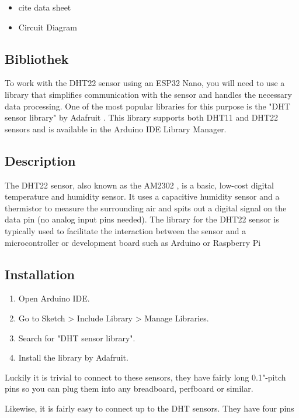 \begin{itemize}
  \item cite data sheet
  \item Circuit Diagram
\end{itemize}

\subsection{Bibliothek}

To work with the DHT22 sensor using an ESP32 Nano, you will need to use a library that simplifies communication with the sensor and handles the necessary data processing. One of the most popular libraries for this purpose is the "DHT sensor library" by Adafruit \cite{Widianto:2022}. This library supports both DHT11 and DHT22 sensors and is available in the Arduino IDE Library Manager.

\subsection{Description}
The DHT22 sensor, also known as the AM2302 \cite{Rupin:2023}, is a basic, low-cost digital temperature and humidity sensor. It uses a capacitive humidity sensor and a thermistor to measure the surrounding air and spits out a digital signal on the data pin (no analog input pins needed). The library for the DHT22 sensor is typically used to facilitate the interaction between the sensor and a microcontroller or development board such as Arduino or Raspberry Pi

\subsection{Installation}


	\begin{enumerate}
		\item Open Arduino IDE.
		\item Go to Sketch > Include Library > Manage Libraries.
		\item Search for "DHT sensor library".
		\item Install the library by Adafruit.
	\end{enumerate}


Luckily it is trivial to connect to these sensors, they have fairly long 0.1"-pitch pins so you can plug them into any breadboard, perfboard or similar.

Likewise, it is fairly easy to connect up to the DHT sensors. They have four pins

